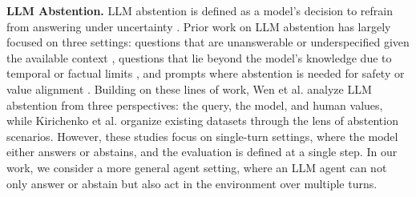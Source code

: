 \documentclass{llmxive}
\begin{document}
\textbf{LLM Abstention.} LLM abstention is defined as a model’s decision to refrain from answering under uncertainty \cite{wen2025know, kirichenko2025abstentionbench, wen2025marvel, wen2024characterizing}. Prior work on LLM abstention has largely focused on three settings: questions that are unanswerable or underspecified given the available context \cite{cao2026clarify, kwiatkowski2019natural, trivedi2022musique, reddy2019coqa, choi2018quac, min2020ambigqa, zhang2021situatedqa, yin2023large, amayuelas2024knowledge,jin2019pubmedqa, dasigi2021dataset}, questions that lie beyond the model’s knowledge due to temporal or factual limits \cite{kasai2023realtime, yang2024alignment, feng2024don, mallen2023not, sciavolino2021simple}, and prompts where abstention is needed for safety or value alignment \cite{han2024wildguard, gehman2020realtoxicityprompts, hartvigsen2022toxigen, elsherief2021latent, lin2023toxicchat, ji2023beavertails, xu2023cvalues, rottger2024xstest, qiu2023latent, shen2024anything, wang2024not, wang2023all, li2024salad, xie2024sorry}. Building on these lines of work, Wen et al. \cite{wen2025know} analyze LLM abstention from three perspectives: the query, the model, and human values, while Kirichenko et al. \cite{kirichenko2025abstentionbench} organize existing datasets through the lens of abstention scenarios. However, these studies focus on single-turn settings, where the model either answers or abstains, and the evaluation is defined at a single step. In our work, we consider a more general agent setting, where an LLM agent can not only answer or abstain but also act in the environment over multiple turns.
\end{document}
